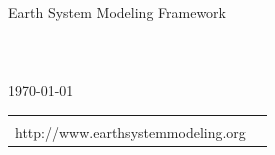 %


\begin{titlepage}

\begin{center}
{\Large Earth System Modeling Framework } \\
\vspace{.25in}
{\Large {\bf \mytitle}} \\
\vspace{.25in}
{\large {\bf \myversion}} \\
\vspace{.5in}
{\large {\it \myauthors}} \\
\vspace{.25in}
{\large {\today}}
\vspace{.25in}
\end{center}

\begin{latexonly}
\vspace{4in}
\begin{tabular}{p{5in}p{.9in}}
\hrulefill \\
\noindent http://www.earthsystemmodeling.org \\
\end{tabular}
\end{latexonly}

\end{titlepage}














